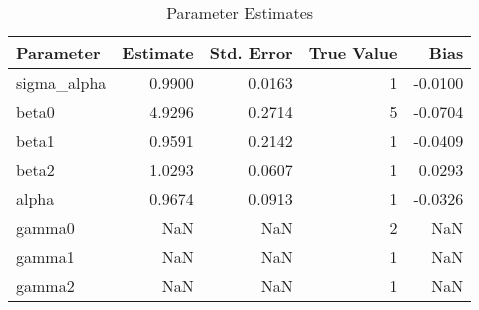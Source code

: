 \begin{table}
\caption{Parameter Estimates}
\begin{tabular}{lrrrr}
\toprule
Parameter & Estimate & Std. Error & True Value & Bias \\
\midrule
sigma_alpha & 0.9900 & 0.0163 & 1 & -0.0100 \\
beta0 & 4.9296 & 0.2714 & 5 & -0.0704 \\
beta1 & 0.9591 & 0.2142 & 1 & -0.0409 \\
beta2 & 1.0293 & 0.0607 & 1 & 0.0293 \\
alpha & 0.9674 & 0.0913 & 1 & -0.0326 \\
gamma0 & NaN & NaN & 2 & NaN \\
gamma1 & NaN & NaN & 1 & NaN \\
gamma2 & NaN & NaN & 1 & NaN \\
\bottomrule
\end{tabular}
\end{table}
